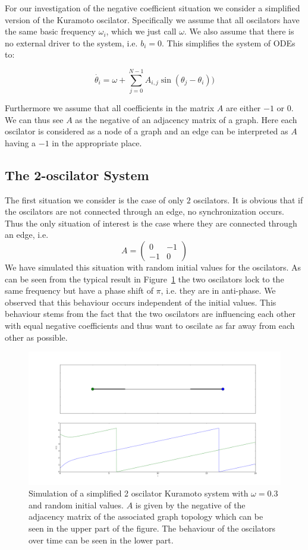\label{sec:negative}
For our investigation of the negative coefficient situation we consider a simplified version of the Kuramoto oscilator. Specifically we assume that all oscilators have the same basic frequency $\omega_i$, which we just call $\omega$. We also assume that there is no external driver to the system, i.e. $b_i = 0$. This simplifies the system of ODEs to: 

\[
\dot{\theta_i} = \omega + \sum_{j = 0}^{N - 1}{A_{i, j}\sin({\theta_j - \theta_i})}
)\]

Furthermore we assume that all coefficients in the matrix $A$ are either $-1$ or $0$. We can thus see $A$ as the negative of an adjacency matrix of a graph. Here each oscilator is considered as a node of a graph and an edge can be interpreted as $A$ having a $-1$ in the appropriate place. 

\subsection{The 2-oscilator System}

The first situation we consider is the case of only $2$ oscilators. It is obvious that if the oscilators are not connected through an edge, no synchronization occurs. Thus the only situation of interest is the case where they are connected through an edge, i.e. 
\[
  A = \left( \begin{array}{cc} 0 & -1\\ -1 & 0 \end{array} \right)
\]
We have simulated this situation with random initial values for the oscilators. As can be seen from the typical result in Figure~\ref{fig:negative_2_osc} the two oscilators lock to the same frequency but have a phase shift of $\pi$, i.e. they are in anti-phase. We observed that this behaviour occurs independent of the initial values. This behaviour stems from the fact that the two oscilators are influencing each other with equal negative coefficients and thus want to oscilate as far away from each other as possible. 

\begin{figure}[h]
  \centering
  \includegraphics[width=\textwidth]{imgs/simple_2_osc}
  \caption{Simulation of a simplified 2 oscilator Kuramoto system with $\omega = 0.3$ and random initial values. $A$ is given by the negative of the adjacency matrix of the associated graph topology which can be seen in the upper part of the figure. The behaviour of the oscilators over time can be seen in the lower part. }
  \label{fig:negative_2_osc}
\end{figure}

